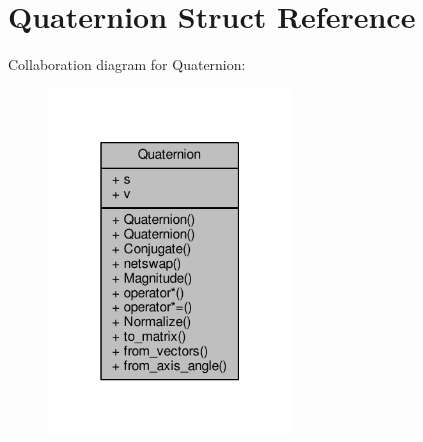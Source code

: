 \hypertarget{structQuaternion}{}\section{Quaternion Struct Reference}
\label{structQuaternion}


Collaboration diagram for Quaternion\+:
\nopagebreak
\begin{figure}[H]
\begin{center}
\leavevmode
\includegraphics[width=183pt]{dd/d27/structQuaternion__coll__graph}
\end{center}
\end{figure}
